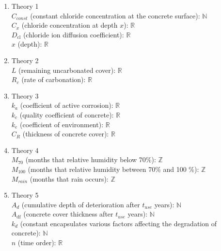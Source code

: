 \documentclass[12pt, titlepage]{article}
\begin{document}
\begin{enumerate}
    \item Theory 1 \\
    $C_{const}$ (constant chloride concentration at the concrete surface): $\mathbb{N}$ \\
    $C_x$ (chloride concentration at depth $x$): $\mathbb{R}$ \\
    $D_\text{cl}$ (chloride ion diffusion coefficient): $\mathbb{R}$\\
    $x$ (depth): $\mathbb{R}$\\
    
    \item Theory 2 \\
    $L$ (remaining uncarbonated cover): $\mathbb{R}$ \\
    $R_c$ (rate of carbonation): $\mathbb{R}$ \\
    
    \item Theory 3 \\
    $k_a$ (coefficient of active corrosion): $\mathbb{R}$ \\
    $k_c$ (quality coefficient of concrete): $\mathbb{R}$ \\
    $k_e$ (coefficient of environment): $\mathbb{R}$\\
    $C_R$ (thickness of concrete cover): $\mathbb{R}$\\
    
    \item Theory 4 \\
    $M_{70}$ (months that relative humidity below 70\%): $\mathbb{Z}$\\
    $M_{100}$ (months that relative humidity between 70\% and 100 \%): $\mathbb{Z}$\\
    $M_{rain}$ (months that rain occurs): $\mathbb{Z}$\\

    \item Theory 5 \\
    $A_d$ (cumulative depth of deterioration after $t_{use}$ years): $\mathbb{N}$\\
    $A_\text{df}$ (concrete cover thickness after $t_{use}$ years): $\mathbb{N}$\\
    $k_d$ (constant encapsulates various factors affecting the degradation of concrete): $\mathbb{N}$\\
    $n$ (time order): $\mathbb{R}$\\
\end{enumerate}
\end{document}
